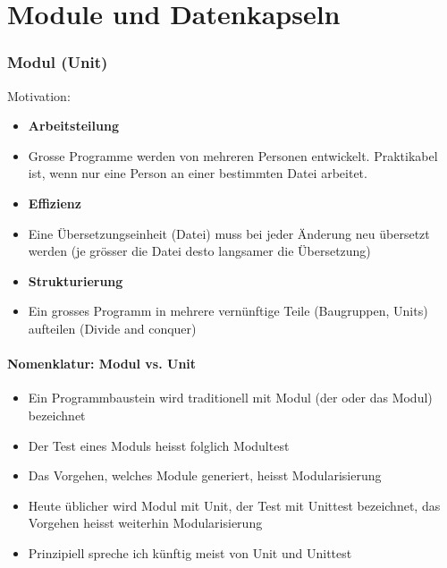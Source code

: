 
\part{Module und Datenkapseln}
\label{sec:Kapitel 6: Module und Datenkapseln}

\section{Modul (Unit)}
\label{sec:Modul (Unit)}
Motivation:\\
\begin{itemize}
	\item \textbf{Arbeitsteilung}
	\item[\-] Grosse Programme werden von mehreren Personen entwickelt. Praktikabel ist, wenn nur eine Person an einer bestimmten Datei arbeitet.
	\item \textbf{Effizienz}
	\item[\-] Eine Übersetzungseinheit (Datei) muss bei jeder Änderung neu übersetzt werden (je grösser die Datei desto langsamer die Übersetzung)
	\item \textbf{Strukturierung}
	\item[\-] Ein grosses  Programm in mehrere vernünftige Teile (Baugruppen, Units) aufteilen (Divide and conquer)
\end{itemize}

\subsection{Nomenklatur: Modul vs. Unit}
\label{sec:Nomenklatur: Modul vs. Unit}
\begin{itemize}
	\item Ein Programmbaustein wird traditionell mit Modul (der oder das Modul) bezeichnet
	\item Der Test eines Moduls heisst folglich Modultest
	\item Das Vorgehen, welches Module generiert, heisst Modularisierung
	\item Heute üblicher wird Modul mit Unit, der Test mit Unittest bezeichnet, das Vorgehen heisst weiterhin Modularisierung
	\item Prinzipiell spreche ich künftig meist von Unit und Unittest
\end{itemize}

